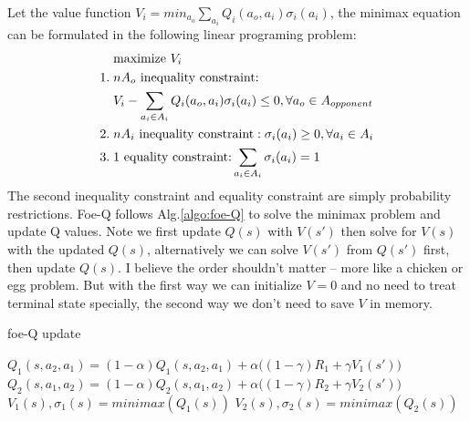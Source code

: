 \documentclass[conference]{IEEEtran}
\begin{document}
Let the value function $V_i = min_{a_o} \sum_{a_i}Q_i(a_o, a_i) \sigma_i(a_i)$, the minimax equation can be formulated in the following linear programing problem:
\begin{align}
& \text{maximize $V_i$} \notag \\
1.\; & \text{$nA_o$ inequality constraint:} \notag \notag\\
& V_i-\sum_{a_i\in A_i} Q_i(a_o, a_i)\sigma_i(a_i)\le 0, \forall a_o \in A_{opponent} \notag \\ 
2.\; & \text{$nA_i$ inequality constraint}:  \sigma_i(a_i) \ge 0, \forall a_i\in A_i \notag\\
3.\; & \text{1 equality constraint:} \sum_{a_i\in A_i} \sigma_i(a_i) = 1
\end{align}
The second inequality constraint and equality constraint are simply probability restrictions. Foe-Q follows Alg.\ref{algo:foe-Q} to solve the minimax problem and update Q values. Note we first update $Q(s)$ with $V(s')$ then solve for $V(s)$ with the updated $Q(s)$, alternatively we can solve $V(s')$ from $Q(s')$ first, then update $Q(s)$. I believe the order shouldn't matter -- more like a chicken or egg problem. But with the first way we can initialize $V=0$ and no need to treat terminal state specially, the second way we don't need to save $V$ in memory.

\begin{algorithm}[h!]
	\caption{foe-Q update}
	\begin{algorithmic}
		\State $Q_1(s, a_2, a_1) = (1-\alpha) Q_1(s, a_2, a_1) + \alpha  \big( (1-\gamma) R_1 + \gamma V_1(s') \big)$
		\State $Q_2(s, a_1, a_2) = (1-\alpha) Q_2(s, a_1, a_2) + \alpha  \big( (1-\gamma) R_2 + \gamma V_2(s') \big)$
		\State $V_1(s), \sigma_1(s) = minimax(Q_1(s))$
		\State $V_2(s), \sigma_2(s) = minimax(Q_2(s))$
		\EndFunction
	\end{algorithmic}
	\label{algo:foe-Q}
\end{algorithm}
\end{document}
